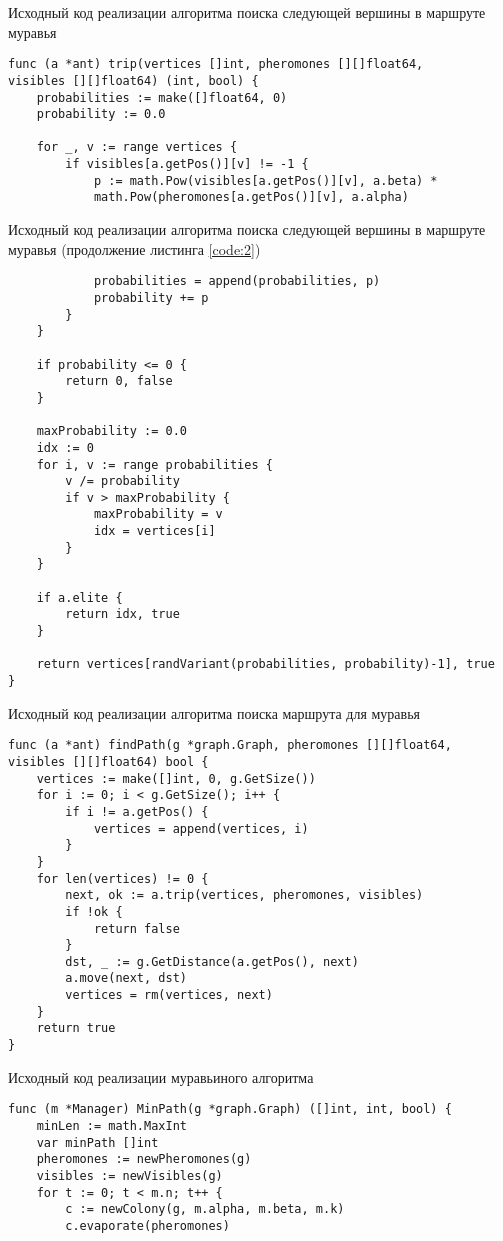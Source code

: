 \begin{code}
\caption{Исходный код реализации алгоритма поиска следующей вершины в маршруте муравья}
\label{code:2}
\begin{verbatim}
func (a *ant) trip(vertices []int, pheromones [][]float64, 
visibles [][]float64) (int, bool) {
	probabilities := make([]float64, 0)
	probability := 0.0

	for _, v := range vertices {
		if visibles[a.getPos()][v] != -1 {
			p := math.Pow(visibles[a.getPos()][v], a.beta) * 
			math.Pow(pheromones[a.getPos()][v], a.alpha)
\end{verbatim}
\end{code}

\newpage

\begin{code}
\caption{Исходный код реализации алгоритма поиска следующей вершины в маршруте муравья (продолжение листинга \ref{code:2})}
\label{code:3}
\begin{verbatim}
			probabilities = append(probabilities, p)
			probability += p
		}
	}

	if probability <= 0 {
		return 0, false
	}

	maxProbability := 0.0
	idx := 0
	for i, v := range probabilities {
		v /= probability
		if v > maxProbability {
			maxProbability = v
			idx = vertices[i]
		}
	}

	if a.elite {
		return idx, true
	}

	return vertices[randVariant(probabilities, probability)-1], true
}
\end{verbatim}
\end{code}

\newpage

\begin{code}
\caption{Исходный код реализации алгоритма поиска маршрута для муравья}
\label{code:4}
\begin{verbatim}
func (a *ant) findPath(g *graph.Graph, pheromones [][]float64, 
visibles [][]float64) bool {
	vertices := make([]int, 0, g.GetSize())
	for i := 0; i < g.GetSize(); i++ {
		if i != a.getPos() {
			vertices = append(vertices, i)
		}
	}
	for len(vertices) != 0 {
		next, ok := a.trip(vertices, pheromones, visibles)
		if !ok {
			return false
		}
		dst, _ := g.GetDistance(a.getPos(), next)
		a.move(next, dst)
		vertices = rm(vertices, next)
	}
	return true
}
\end{verbatim}
\end{code}

\begin{code}
\caption{Исходный код реализации муравьиного алгоритма}
\label{code:5}
\begin{verbatim}
func (m *Manager) MinPath(g *graph.Graph) ([]int, int, bool) {
	minLen := math.MaxInt
	var minPath []int
	pheromones := newPheromones(g)
	visibles := newVisibles(g)
	for t := 0; t < m.n; t++ {
		c := newColony(g, m.alpha, m.beta, m.k)
		c.evaporate(pheromones)
\end{verbatim}
\end{code}

